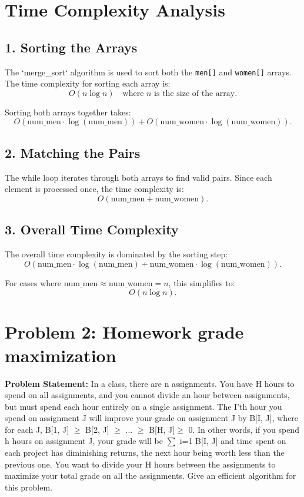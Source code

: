 \documentclass[a4paper,12pt]{report}
\begin{document}
\section*{Time Complexity Analysis}

\subsection*{1. Sorting the Arrays}
The `merge\_sort` algorithm is used to sort both the \texttt{men[]} and \texttt{women[]} arrays.  
The time complexity for sorting each array is:
\[
O(n \log n) \quad \text{where } n \text{ is the size of the array.}
\]

Sorting both arrays together takes:
\[
O(\text{num\_men} \cdot \log(\text{num\_men})) + O(\text{num\_women} \cdot \log(\text{num\_women})).
\]

\subsection*{2. Matching the Pairs}
The while loop iterates through both arrays to find valid pairs.  
Since each element is processed once, the time complexity is:
\[
O(\text{num\_men} + \text{num\_women}).
\]

\subsection*{3. Overall Time Complexity}
The overall time complexity is dominated by the sorting step:
\[
O(\text{num\_men} \cdot \log(\text{num\_men}) + \text{num\_women} \cdot \log(\text{num\_women})).
\]

For cases where \(\text{num\_men} \approx \text{num\_women} = n\), this simplifies to:
\[
O(n \log n).
\]

\newpage
\section*{Problem 2: Homework grade maximization}
\textbf{Problem Statement:}  
In a class, there are n assignments. You have H hours to spend on all assignments, and you cannot divide an hour between assignments, but must spend each hour entirely on a single assignment. The I’th hour you spend on assignment J will improve your grade on assignment J by B[I, J], where for each J, B[1, J] $\ge$ B[2, J] $\ge$ ... $\ge$ B[H, J]$\ge$ 0. In other words, if you spend h hours on assignment J, your grade will be $\sum$ i=1 B[I, J] and time spent on each project has diminishing returns, the next hour being worth less than the previous one. You want to divide your H hours between the assignments to maximize your total grade on all the assignments. Give an efficient algorithm for this problem.
\end{document}
